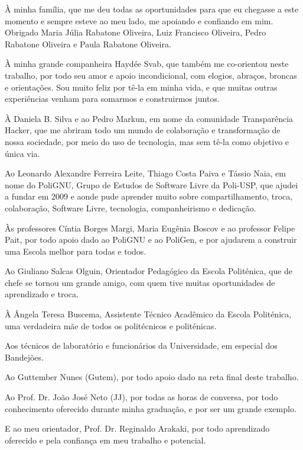 À minha família, que me deu todas as oportunidades para que eu chegasse a este momento e sempre esteve ao meu lado, me apoiando e confiando em mim. Obrigado Maria Júlia Rabatone Oliveira, Luiz Francisco Oliveira, Pedro Rabatone Oliveira e Paula Rabatone Oliveira.

À minha grande companheira Haydée Svab, que também me co-orientou neste trabalho, por todo seu amor e apoio incondicional, com elogios, abraços, broncas e orientações. Sou muito feliz por tê-la em minha vida, e que muitas outras experiências venham para somarmos e construirmos juntos.

À Daniela B. Silva e ao Pedro Markun, em nome da comunidade Transparência Hacker, que me abriram todo um mundo de colaboração e transformação de nossa sociedade, por meio do uso de tecnologia, mas sem tê-la como objetivo e única via.

Ao Leonardo Alexandre Ferreira Leite, Thiago Costa Paiva e Tássio Naia, em nome do PoliGNU, Grupo de Estudos de Software Livre da Poli-USP, que ajudei a fundar em 2009 e aonde pude aprender muito sobre compartilhamento, troca, colaboração, Software Livre, tecnologia, companheirismo e dedicação.

Às professores Cíntia Borges Margi, Maria Eugênia Boscov e ao professor Felipe Pait, por todo apoio dado ao PoliGNU e ao PoliGen, e por ajudarem a construir uma Escola melhor para todas e todos.

Ao Giuliano Salcas Olguin, Orientador Pedagógico da Escola Politénica, que de chefe se tornou um grande amigo, com quem tive muitas oportunidades de aprendizado e troca.

À Ângela Teresa Buscema, Assistente Técnico Acadêmico da Escola Politénica, uma verdadeira mãe de todos os politécnicos e politénicas.

Aos técnicos de laboratório e funcionários da Universidade, em especial dos Bandejões.

Ao Guttember Nunes (Gutem), por todo apoio dado na reta final deste trabalho.

Ao Prof. Dr. João José Neto (JJ), por todas as horas de conversa, por todo conhecimento oferecido durante minha graduação, e por ser um grande exemplo.

E ao meu orientador, Prof. Dr. Reginaldo Arakaki, por todo aprendizado oferecido e pela confiança em meu trabalho e potencial.